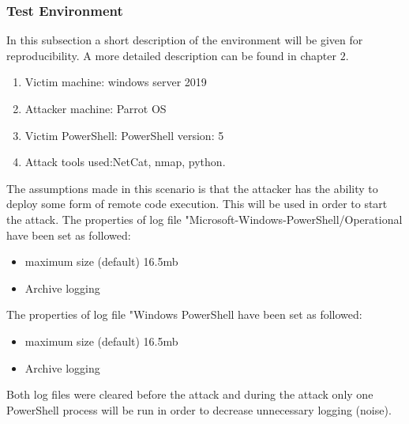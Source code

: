 \documentclass{article}%
\begin{document}
\subsubsection{Test Environment}
In this subsection a short description of the environment will be given for reproducibility. A more detailed description can be found in chapter $2$.
\begin{enumerate}
	\item Victim machine: windows server 2019
	\item Attacker machine: Parrot OS
	\item Victim PowerShell: PowerShell version: 5
	\item Attack tools used:NetCat, nmap, python.
\end{enumerate}
The assumptions made in this scenario is that the attacker has the ability to deploy some form of remote code execution. This will be used in order to start the attack.
The properties of log file "Microsoft-Windows-PowerShell/Operational have been set as followed:
\begin{itemize}
	\item maximum size (default) 16.5mb
	\item Archive logging
\end{itemize}
The properties of log file "Windows PowerShell have been set as followed:
\begin{itemize}
	\item maximum size (default) 16.5mb
	\item Archive logging
\end{itemize}
Both log files were cleared before the attack and during the attack only one PowerShell process will be run in order to decrease unnecessary logging (noise).
\end{document}
